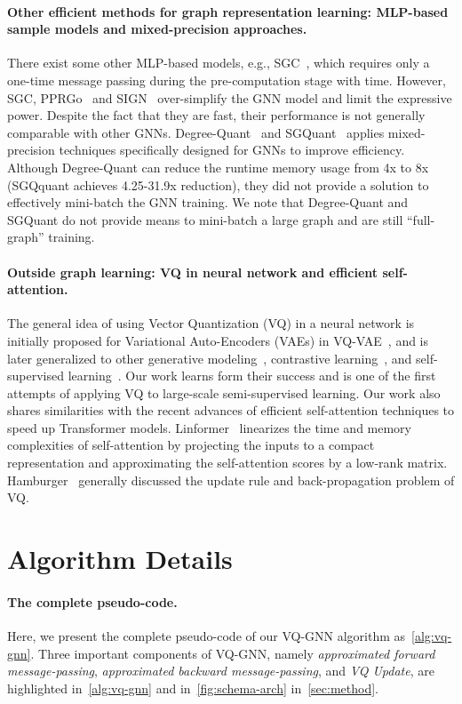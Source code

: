 \documentclass{article}
\newcommand{\cm}{\paragraph}
\renewcommand{\emph}[1]{\textit{#1}}
\begin{document}
\cm{Other efficient methods for graph representation learning: MLP-based sample models and mixed-precision approaches.}
There exist some other MLP-based models, e.g., SGC~\citep{wu2019simplifying}, which requires only a one-time message passing during the pre-computation stage with  time. However, SGC, PPRGo~\citep{bojchevski2020scaling} and SIGN~\citep{rossi2020sign} over-simplify the GNN model and limit the expressive power. Despite the fact that they are fast, their performance is not generally comparable with other GNNs. Degree-Quant~\citep{tailor2020degree} and SGQuant~\citep{feng2020sgquant} applies mixed-precision techniques specifically designed for GNNs to improve efficiency. Although Degree-Quant can reduce the runtime memory usage from 4x to 8x (SGQquant achieves 4.25-31.9x reduction), they did not provide a solution to effectively mini-batch the GNN training. We note that Degree-Quant and SGQuant do not provide means to mini-batch a large graph and are still ``full-graph'' training. 


\cm{Outside graph learning: VQ in neural network and efficient self-attention.}
The general idea of using Vector Quantization (VQ) in a neural network is initially proposed for Variational Auto-Encoders (VAEs) in VQ-VAE~\citep{oord2017neural, razavi2019generating}, and is later generalized to other generative modeling~\citep{maaloe2019biva}, contrastive learning~\citep{caron2020unsupervised}, and self-supervised learning~\citep{baevski2019vq, baevski2020wav2vec}. Our work learns form their success and is one of the first attempts of applying VQ to large-scale semi-supervised learning. Our work also shares similarities with the recent advances of efficient self-attention techniques to speed up Transformer models. Linformer~\citep{wang2020linformer} linearizes the time and memory complexities of self-attention by projecting the inputs to a compact representation and approximating the self-attention scores by a low-rank matrix. Hamburger~\citep{geng2021attention} generally discussed the update rule and back-propagation problem of VQ.



\section{Algorithm Details}
\label{apd:algorithm}

\cm{The complete pseudo-code.}
Here, we present the complete pseudo-code of our VQ-GNN algorithm as~\cref{alg:vq-gnn}. Three important components of VQ-GNN, namely \emph{approximated forward message-passing}, \emph{approximated backward message-passing}, and \emph{VQ Update}, are highlighted in~\cref{alg:vq-gnn} and in~\cref{fig:schema-arch} in~\cref{sec:method}. 
\end{document}
